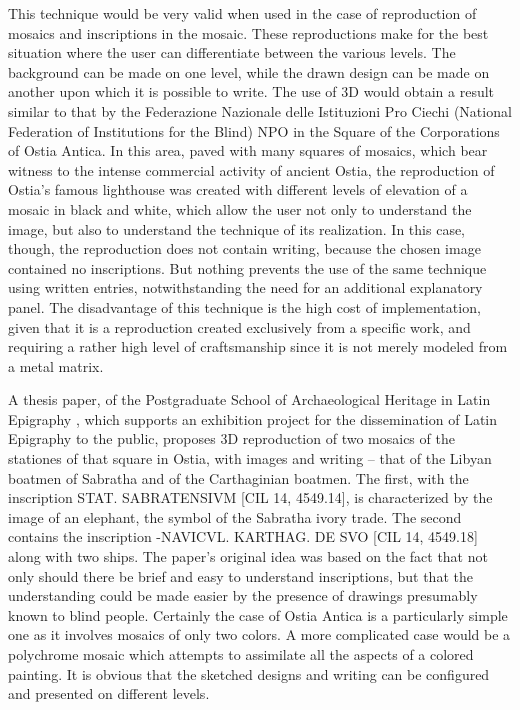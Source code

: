 \documentclass[amsthm,ebook]{saparticle}
\begin{document}
This technique would be very valid when used in the case of reproduction of mosaics and inscriptions in the mosaic.
These reproductions make for the best situation where the user can differentiate between the various levels. The
background can be made on one level, while the drawn design can be made on another upon which it is possible to write. The
use of 3D would obtain a result similar to that by the Federazione Nazionale delle Istituzioni Pro Ciechi (National
Federation of Institutions for the Blind) NPO in the Square of the Corporations of Ostia Antica. In this area, paved
with many squares of mosaics, which bear witness to the intense commercial activity of ancient Ostia, the reproduction
of Ostia’s famous lighthouse was created with different levels of elevation of a mosaic in black and white, which allow
the user not only to understand the image, but also to understand the technique of its realization. In this case,
though, the reproduction does not contain writing, because the chosen image contained no inscriptions. But nothing
prevents the use of the same technique using written entries, notwithstanding the need for an additional explanatory
panel. The disadvantage of this technique is the high cost of implementation, given that it is a reproduction created
exclusively from a specific work, and requiring a rather high level of craftsmanship since it is not merely modeled
from a metal matrix.

A thesis paper, of the Postgraduate School of Archaeological Heritage in Latin Epigraphy \citep{Licordari2015}, which
supports an exhibition project for the dissemination of Latin Epigraphy to the public, proposes 3D reproduction of two
mosaics of the stationes of that square in Ostia, with images and writing – that of the Libyan boatmen of Sabratha and
of the Carthaginian boatmen. The first, with the inscription STAT. SABRATENSIVM [CIL 14, 4549.14], is characterized by
the image of an elephant, the symbol of the Sabratha ivory trade. The second contains the inscription -NAVICVL.
KARTHAG. DE SVO [CIL 14, 4549.18] along with two ships. The paper’s original idea was based on the fact that not only
should there be brief and easy to understand inscriptions, but that the understanding could be made easier by the
presence of drawings presumably known to blind people. Certainly the case of Ostia Antica is a particularly simple one
as it involves mosaics of only two colors. A more complicated case would be a polychrome mosaic which attempts to
assimilate all the aspects of a colored painting. It is obvious that the sketched designs and writing can be configured
and presented on different levels.
\end{document}
